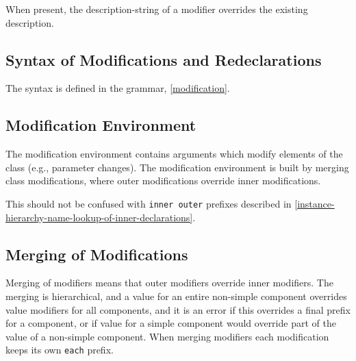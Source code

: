 When present, the description-string of a modifier overrides the existing description.

\subsection{Syntax of Modifications and Redeclarations}\label{syntax-of-modifications-and-redeclarations}

The syntax is defined in the grammar, \cref{modification}.

\subsection{Modification Environment}\label{modification-environment}

The modification environment contains arguments which modify elements of
the class (e.g., parameter changes). The modification environment is
built by merging class modifications, where outer modifications override
inner modifications.

\begin{nonnormative}
This should not be confused with \lstinline!inner outer! prefixes described in \cref{instance-hierarchy-name-lookup-of-inner-declarations}.
\end{nonnormative}

\subsection{Merging of Modifications}\label{merging-of-modifications}

Merging of modifiers means that outer modifiers override inner
modifiers. The merging is hierarchical, and a value for an entire
non-simple component overrides value modifiers for all components, and
it is an error if this overrides a final prefix for a component, or if
value for a simple component would override part of the value of a
non-simple component. When merging modifiers each modification keeps its
own \lstinline!each! prefix.

